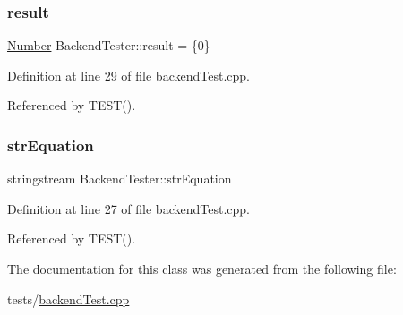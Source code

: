 \mbox{\label{class_backend_tester_a4c0eeb2e7a5f1ef876b6e61fdb1701fc}} 
\subsubsection{\texorpdfstring{result}{result}}
{\footnotesize\ttfamily \hyperlink{classteam22_1_1_math_1_1_number}{Number} Backend\+Tester\+::result = \{0\}}



Definition at line 29 of file backend\+Test.\+cpp.



Referenced by T\+E\+S\+T().

\mbox{\label{class_backend_tester_ac42c696a31021852c1868c2e45f1d8b1}} 
\subsubsection{\texorpdfstring{str\+Equation}{strEquation}}
{\footnotesize\ttfamily stringstream Backend\+Tester\+::str\+Equation}



Definition at line 27 of file backend\+Test.\+cpp.



Referenced by T\+E\+S\+T().



The documentation for this class was generated from the following file\+:\begin{DoxyCompactItemize}
\item 
tests/\hyperlink{backend_test_8cpp}{backend\+Test.\+cpp}\end{DoxyCompactItemize}
